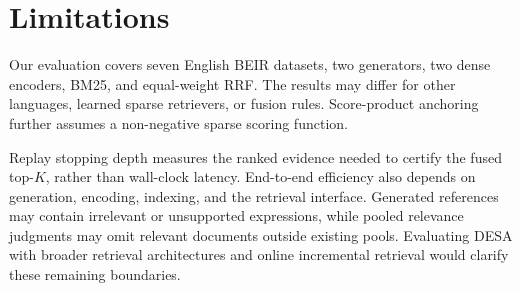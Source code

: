 \section*{Limitations}

Our evaluation covers seven English BEIR datasets, two generators, two
dense encoders, BM25, and equal-weight RRF. The results may differ for other
languages, learned sparse retrievers, or fusion rules. Score-product anchoring
further assumes a non-negative sparse scoring function.

Replay stopping depth measures the ranked evidence needed to certify the fused
top-$K$, rather than wall-clock latency. End-to-end efficiency also depends on
generation, encoding, indexing, and the retrieval interface. Generated
references may contain irrelevant or unsupported expressions, while pooled
relevance judgments may omit relevant documents outside existing pools.
Evaluating DESA with broader retrieval architectures and online incremental
retrieval would clarify these remaining boundaries.
